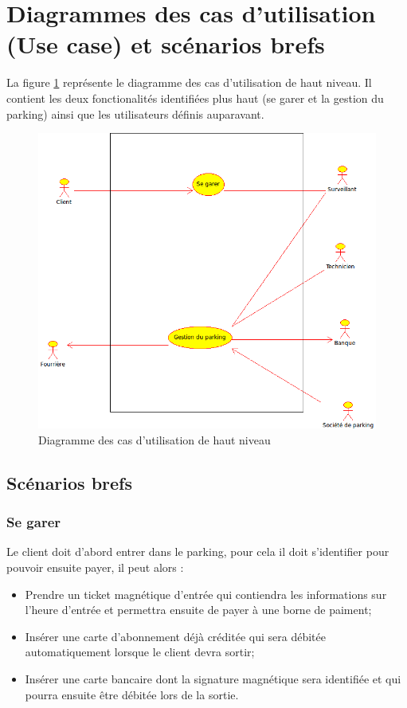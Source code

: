 \documentclass[a4paper]{article}
\begin{document}
\section{Diagrammes des cas d'utilisation (Use case) et sc\'enarios brefs}
La figure \ref{usecase} repr\'esente le diagramme des cas d'utilisation
de haut niveau. Il contient les deux fonctionalit\'es identifi\'ees plus
haut (se garer et la gestion du parking) ainsi que les utilisateurs
d\'efinis auparavant.
\begin{figure}[!ht]
	\centering
	\includegraphics[scale=.7]{parking.png}
	\caption{\label{usecase} Diagramme des cas d'utilisation de haut niveau}
\end{figure}
\newpage
\subsection{Sc\'enarios brefs}
\subsubsection{Se garer}
Le client doit d'abord entrer dans le parking, pour cela il doit s'identifier pour pouvoir ensuite payer, il peut alors :
\begin{itemize}
		\item Prendre un ticket magn\'etique d'entr\'ee qui contiendra les informations sur l'heure d'entr\'ee et permettra ensuite de payer \`a une borne de paiment;
		\item Ins\'erer une carte d'abonnement d\'ej\`a cr\'edit\'ee qui sera d\'ebit\'ee automatiquement lorsque le client devra sortir;
		\item Ins\'erer une carte bancaire dont la signature magn\'etique sera identifi\'ee et qui pourra ensuite \^etre d\'ebit\'ee lors de la sortie.
\end{itemize}
\end{document}
